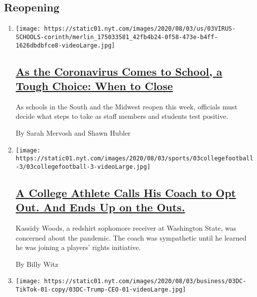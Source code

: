 \hypertarget{reopening}{%
\subsection{Reopening}\label{reopening}}

\begin{enumerate}
\def\labelenumi{\arabic{enumi}.}
\item
  \texttt{[image: https://static01.nyt.com/images/2020/08/03/us/03VIRUS-SCHOOLS-corinth/merlin\_175033581\_42fb4b24-0f58-473e-b4ff-1626dbdbfce8-videoLarge.jpg]}

  \hypertarget{as-the-coronavirus-comes-to-school-a-tough-choice-when-to-close}{%
  \subsection{\texorpdfstring{\href{/2020/08/03/us/school-closing-coronavirus.html}{As
  the Coronavirus Comes to School, a Tough Choice: When to
  Close}}{As the Coronavirus Comes to School, a Tough Choice: When to Close}}\label{as-the-coronavirus-comes-to-school-a-tough-choice-when-to-close}}

  As schools in the South and the Midwest reopen this week, officials
  must decide what steps to take as staff members and students test
  positive.

  By Sarah Mervosh and Shawn Hubler
\item
  \texttt{[image: https://static01.nyt.com/images/2020/08/03/sports/03collegefootball-3/03collegefootball-3-videoLarge.jpg]}

  \hypertarget{a-college-athlete-calls-his-coach-to-opt-out-and-ends-up-on-the-outs}{%
  \subsection{\texorpdfstring{\href{/2020/08/03/sports/coronavirus-college-athletes-opt-out.html}{A
  College Athlete Calls His Coach to Opt Out. And Ends Up on the
  Outs.}}{A College Athlete Calls His Coach to Opt Out. And Ends Up on the Outs.}}\label{a-college-athlete-calls-his-coach-to-opt-out-and-ends-up-on-the-outs}}

  Kassidy Woods, a redshirt sophomore receiver at Washington State, was
  concerned about the pandemic. The coach was sympathetic until he
  learned he was joining a players' rights initiative.

  By Billy Witz
\item
  \texttt{[image: https://static01.nyt.com/images/2020/08/03/business/03DC-TikTok-01-copy/03DC-Trump-CEO-01-videoLarge.jpg]}


\end{enumerate}
